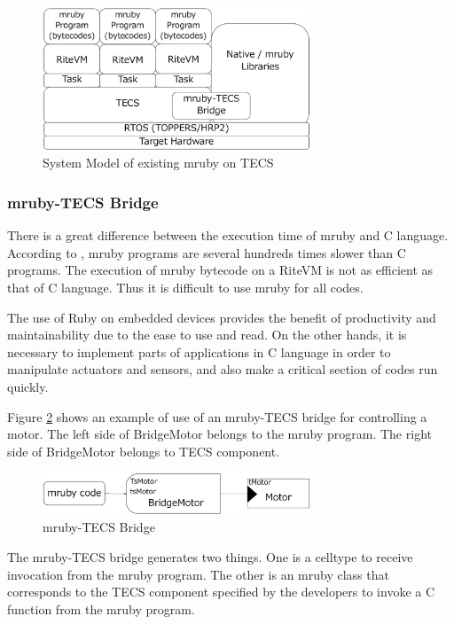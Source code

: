 \documentclass{sig-alternate-05-2015}
\begin{document}
\begin{figure}[t]
    \centering
    \includegraphics[width=8cm,clip]{figure/mrubyontecs.eps}
    \caption{System Model of existing mruby on TECS}
    \label{fig:mrubyontecs}
\end{figure}

\subsubsection{mruby-TECS Bridge}
There is a great difference between the execution time of mruby and C language.
According to  \cite{par:mrubyonTECS}, mruby programs are several hundreds times slower than C programs.
The execution of mruby bytecode on a RiteVM is not as efficient as that of C language.
Thus it is difficult to use mruby for all codes.

The use of Ruby on embedded devices provides the benefit of productivity and maintainability due to the ease to use and read.
On the other hands, it is necessary to implement parts of applications in C language in order to manipulate actuators and sensors, and also make a critical section of codes run quickly.

Figure \ref{fig:mruby_TECS_bridge} shows an example of use of an mruby-TECS bridge for controlling a motor.
The left side of BridgeMotor belongs to the mruby program.
The right side of BridgeMotor belongs to TECS component.
\begin{figure}[t]
    \centering
    \includegraphics[width=8cm,clip]{figure/mruby_TECS_bridge.eps}
    \caption{mruby-TECS Bridge}
    \label{fig:mruby_TECS_bridge}
\end{figure}

The mruby-TECS bridge generates two things.
One is a {\myit celltype} to receive invocation from the mruby program.
The other is an mruby class that corresponds to the TECS component specified by the developers to invoke a C function from the mruby program.
\end{document}
